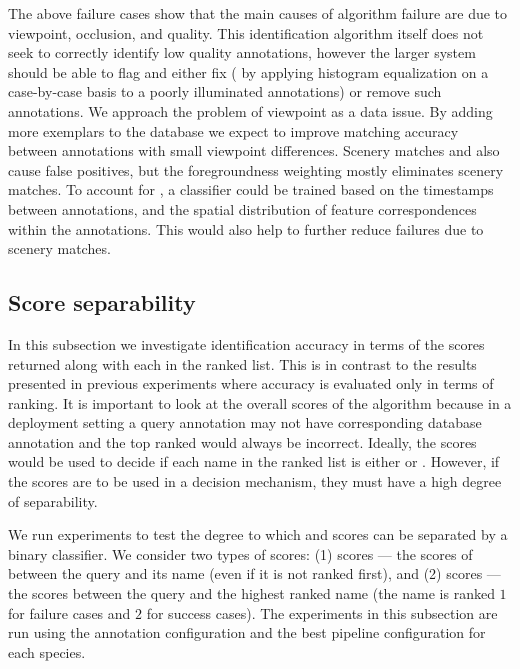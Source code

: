         The above failure cases show that the main causes of algorithm failure are due to viewpoint, occlusion,
          and quality.
        This identification algorithm itself does not seek to correctly identify low quality annotations, however
          the larger system should be able to flag and either fix (\eg{} by applying histogram equalization on a
          case-by-case basis to a poorly illuminated annotations) or remove such annotations.
        We approach the problem of viewpoint as a data issue.
        By adding more exemplars to the database we expect to improve matching accuracy between annotations with
          small viewpoint differences.
        Scenery matches and \photobombings{} also cause false positives, but the foregroundness weighting mostly
          eliminates scenery matches.
        To account for \photobombings{}, a classifier could be trained based on the timestamps between
          annotations, and the spatial distribution of feature correspondences within the annotations.
        This would also help to further reduce failures due to scenery matches.
        
    \subsection{Score separability}\label{sub:exptsep}  
        In this subsection we investigate identification accuracy in terms of the scores returned along with each
          \name{} in the ranked list.
        This is in contrast to the results presented in previous experiments where accuracy is evaluated only in
          terms of ranking.
        It is important to look at the overall scores of the algorithm because in a deployment setting a query
          annotation may not have corresponding \groundtrue{} database annotation and the top ranked \name{} would
          always be incorrect.
        Ideally, the scores would be used to decide if each name in the ranked list is either \groundtrue{} or
          \groundfalse{}.
        However, if the scores are to be used in a decision mechanism, they must have a high degree of
          separability.

        We run experiments to test the degree to which \groundtrue{} and \groundfalse{} scores can be separated
          by a binary classifier.
        We consider two types of scores:
        (1) \groundtrue{} scores --- the scores of between the query and its \groundtrue{} name (even if it is
          not ranked first), and
        (2) \groundfalse{} scores --- the scores between the query and the highest ranked \groundfalse{} name
          (the \groundfalse{} name is ranked $1$\st{} for failure cases and $2$\nd{} for success cases).
        The experiments in this subsection are run using the \timectrl{} annotation configuration and the best
          pipeline configuration for each species.
           
